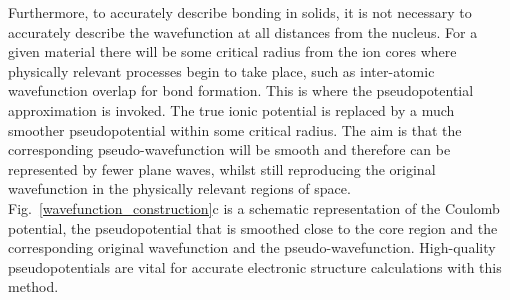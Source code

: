 \documentclass[11pt, twoside]{report}
\begin{document}

Furthermore, to accurately describe bonding in solids, it is not necessary to accurately describe the wavefunction at all distances from the nucleus. For a given material there will be some critical radius from the ion cores where physically relevant processes begin to take place, such as inter-atomic wavefunction overlap for bond formation. This is where the pseudopotential approximation is invoked. The true ionic potential is replaced by a much smoother pseudopotential within some critical radius. The aim is that the corresponding pseudo-wavefunction will be smooth and therefore can be represented by fewer plane waves, whilst still reproducing the original wavefunction in the physically relevant regions of space. Fig.~\ref{wavefunction_construction}c is a schematic representation of the Coulomb potential, the pseudopotential that is smoothed close to the core region and the corresponding original wavefunction and the pseudo-wavefunction. High-quality pseudopotentials are vital for accurate electronic structure calculations with this method. 
\end{document}
